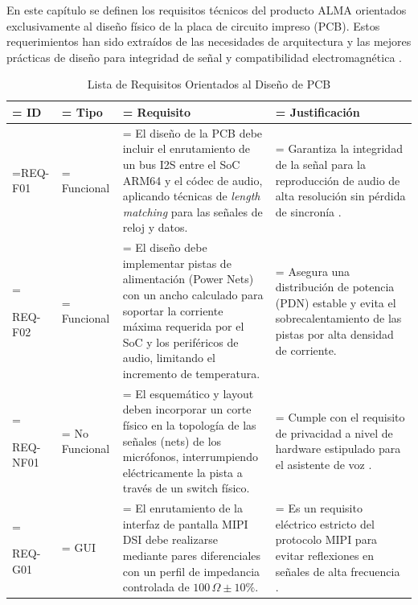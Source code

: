 \documentclass[%
	paper=a4,				%
	twoside=false,				%
	parskip=half,				%
	chapterprefix=false, 		%
	10pt,						%
	headings=normal,			%
	bibliography=totoc,			%
	listof=totoc,				%
	titlepage=on,				%
	captions=tableabove,		%
	draft=false,				%
]{scrbook}%
\begin{document}
En este capítulo se definen los requisitos técnicos del producto ALMA orientados exclusivamente al diseño físico de la placa de circuito impreso (PCB). Estos requerimientos han sido extraídos de las necesidades de arquitectura \cite{guia_proyecto_final} y las mejores prácticas de diseño para integridad de señal y compatibilidad electromagnética \cite{iec62368}.

\begin{table}[H]
    \caption{Lista de Requisitos Orientados al Diseño de PCB}
    \centering
    \renewcommand{\arraystretch}{1.5}
    \begin{tabularx}{\textwidth}{|>{\hsize=0.15\hsize\linewidth=\hsize}X|
                                   >{\hsize=0.15\hsize\linewidth=\hsize}X|
                                   >{\hsize=0.4\hsize\linewidth=\hsize}X|
                                   >{\hsize=0.3\hsize\linewidth=\hsize}X|}
        \hline
        \rowcolor[HTML]{EFEFEF} 
        \textbf{ID} & \textbf{Tipo} & \textbf{Requisito} & \textbf{Justificación} \\ \hline
        
        REQ-F01 & Funcional & El diseño de la PCB debe incluir el enrutamiento de un bus I2S entre el SoC ARM64 y el códec de audio, aplicando técnicas de \textit{length matching} para las señales de reloj y datos. & Garantiza la integridad de la señal para la reproducción de audio de alta resolución sin pérdida de sincronía \cite{guia_proyecto_final}. \\ \hline
        
        REQ-F02 & Funcional & El diseño debe implementar pistas de alimentación (Power Nets) con un ancho calculado para soportar la corriente máxima requerida por el SoC y los periféricos de audio, limitando el incremento de temperatura. & Asegura una distribución de potencia (PDN) estable y evita el sobrecalentamiento de las pistas por alta densidad de corriente. \\ \hline

        REQ-NF01 & No Funcional & El esquemático y layout deben incorporar un corte físico en la topología de las señales (nets) de los micrófonos, interrumpiendo eléctricamente la pista a través de un switch físico. & Cumple con el requisito de privacidad a nivel de hardware estipulado para el asistente de voz \cite{guia_proyecto_final}. \\ \hline
        
        REQ-G01 & GUI & El enrutamiento de la interfaz de pantalla MIPI DSI debe realizarse mediante pares diferenciales con un perfil de impedancia controlada de $100\,\Omega \pm 10\%$. & Es un requisito eléctrico estricto del protocolo MIPI para evitar reflexiones en señales de alta frecuencia \cite{guia_proyecto_final}. \\ \hline
        

\end{tabularx}
\end{table}
\end{document}
